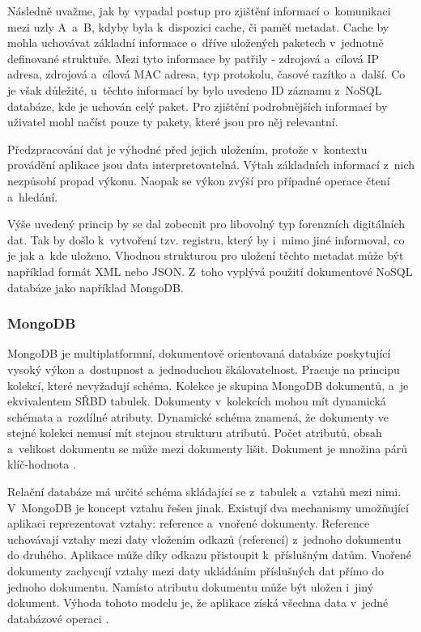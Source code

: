 Následně uvažme, jak by vypadal postup pro zjištění informací o~komunikaci mezi uzly A~a~B, kdyby byla k~dispozici cache, či paměť metadat. Cache by mohla uchovávat základní informace o~dříve uložených paketech v~jednotně definované struktuře. Mezi tyto informace by patřily - zdrojová a~cílová IP adresa, zdrojová a~cílová MAC adresa, typ protokolu, časové razítko a~další. Co je však důležité, u~těchto informací by bylo uvedeno ID záznamu z~NoSQL databáze, kde je uchován celý paket. Pro zjištění podrobnějších informací by uživatel mohl načíst pouze ty pakety, které jsou pro něj relevantní.

Předzpracování dat je výhodné před jejich uložením, protože v~kontextu provádění aplikace jsou data interpretovatelná. Výtah základních informací z~nich nezpůsobí propad výkonu. Naopak se výkon zvýší pro případné operace čtení a~hledání.

Výše uvedený princip by se dal zobecnit pro libovolný typ forenzních digitálních dat. Tak by došlo k~vytvoření tzv. registru, který by i~mimo jiné informoval, co je jak a~kde uloženo. Vhodnou strukturou pro uložení těchto metadat může být například formát XML nebo JSON. Z~toho vyplývá použití dokumentové NoSQL databáze jako například MongoDB.

\subsubsection{MongoDB}
MongoDB je multiplatformní, dokumentově orientovaná databáze poskytující vysoký výkon a~dostupnost a~jednoduchou škálovatelnost. Pracuje na principu kolekcí, které nevyžadují schéma. Kolekce je skupina MongoDB dokumentů, a~je ekvivalentem SŘBD tabulek. Dokumenty v~kolekcích mohou mít dynamická schémata a~rozdílné atributy. Dynamické schéma znamená, že dokumenty ve stejné kolekci nemusí mít stejnou strukturu atributů. Počet atributů, obsah a~velikost dokumentu se může mezi dokumenty lišit. Dokument je množina párů klíč-hodnota \cite{mongoDBTutorialsPoint}.

Relační databáze má určité schéma skládající se z~tabulek a~vztahů mezi nimi. V~MongoDB je koncept vztahu řešen jinak. Existují dva mechanismy umožňující aplikaci reprezentovat vztahy: reference a~vnořené dokumenty. Reference uchovávají vztahy mezi daty vložením odkazů (referencí) z~jednoho dokumentu do druhého. Aplikace může díky odkazu přistoupit k~příslušným datům. Vnořené dokumenty zachycují vztahy mezi daty ukládáním příslušných dat přímo do jednoho dokumentu. Namísto atributu dokumentu může být uložen i~jiný dokument. Výhoda tohoto modelu je, že aplikace získá všechna data v~jedné databázové operaci \cite{mongoDBDataModelingIntro}.


